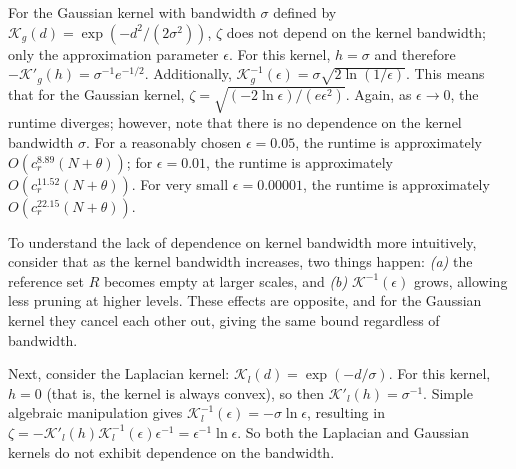 

For the Gaussian kernel with bandwidth $\sigma$ defined by $\mathcal{K}_g(d) =
\exp(-d^2 / (2 \sigma^2))$, $\zeta$ does not
depend on the kernel bandwidth; only
the approximation parameter $\epsilon$.  For this kernel, $h = \sigma$ and
therefore $-\mathcal{K}'_g(h) = \sigma^{-1} e^{-1 / 2}$.  Additionally,
$\mathcal{K}_g^{-1}(\epsilon) = \sigma \sqrt{2 \ln (1 / \epsilon)}$.  This means
that for the Gaussian kernel, $\zeta = \sqrt{(-2 \ln \epsilon) / (e
\epsilon^2)}$.  Again, as $\epsilon \to 0$, the
runtime diverges; however, note that there is no dependence on the kernel
bandwidth $\sigma$.  For a reasonably chosen $\epsilon = 0.05$, the runtime is
approximately $O(c_r^{8.89} (N + \theta))$; for $\epsilon = 0.01$, the runtime
is approximately $O(c_r^{11.52} (N + \theta))$.  For very small $\epsilon =
0.00001$, the runtime is approximately $O(c_r^{22.15} (N + \theta))$.

To understand the lack of dependence on kernel bandwidth more intuitively,
consider that as the kernel bandwidth increases, two things happen: {\it (a)}
the reference set $R$ becomes empty at larger scales, and {\it (b)}
$\mathcal{K}^{-1}(\epsilon)$ grows, allowing less pruning at higher levels.
These effects are opposite, and for the Gaussian kernel they cancel each other
out, giving the same bound regardless of bandwidth.

Next, consider the Laplacian kernel:
$\mathcal{K}_l(d) = \exp(-d / \sigma)$.  For this kernel, $h = 0$ (that is, the
kernel is always convex), so then $\mathcal{K}'_l(h) = \sigma^{-1}$.  Simple
algebraic manipulation gives $\mathcal{K}^{-1}_l(\epsilon) = -\sigma \ln
\epsilon$, resulting in $\zeta = -\mathcal{K}'_l(h) \mathcal{K}^{-1}_l(\epsilon)
\epsilon^{-1} = \epsilon^{-1} \ln \epsilon$.  So both the Laplacian and Gaussian
kernels do not exhibit dependence on the bandwidth.


